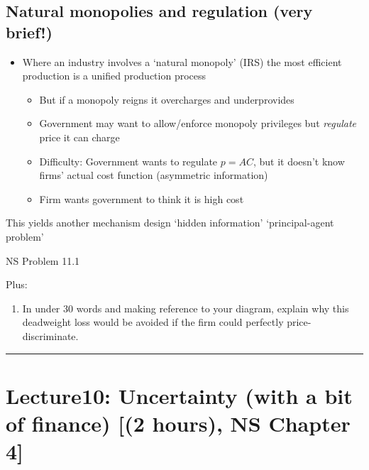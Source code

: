 \documentclass[]{article}
\providecommand{\tightlist}{%
  \setlength{\itemsep}{0pt}\setlength{\parskip}{0pt}}
\begin{document}
\hypertarget{natural-monopolies-and-regulation-very-brief}{%
\subsection{Natural monopolies and regulation (very brief!)}\label{natural-monopolies-and-regulation-very-brief}}

\begin{itemize}
\tightlist
\item
  Where an industry involves a `natural monopoly' (IRS) the most efficient production is a unified production process

  \begin{itemize}
  \tightlist
  \item
    But if a monopoly reigns it overcharges and underprovides
  \item
    Government may want to allow/enforce monopoly privileges but \emph{regulate} price it can charge
  \item
    Difficulty: Government wants to regulate \(p=AC\), but it doesn't know firms' actual cost function (asymmetric information)
  \item
    Firm wants government to think it is high cost
  \end{itemize}
\end{itemize}

This yields another mechanism design `hidden information' `principal-agent problem'

NS Problem 11.1

Plus:

\begin{enumerate}
\def\labelenumi{\alph{enumi}.}
\setcounter{enumi}{3}
\tightlist
\item
  In under 30 words and making reference to your diagram, explain why this deadweight loss would be avoided if the firm could perfectly price-discriminate.
\end{enumerate}

\begin{center}\rule{0.5\linewidth}{\linethickness}\end{center}

\hypertarget{lecture10-uncertainty-with-a-bit-of-finance-2-hours-ns-chapter-4}{%
\section{Lecture10: Uncertainty (with a bit of finance) {[}(2 hours), NS Chapter 4{]}}\label{lecture10-uncertainty-with-a-bit-of-finance-2-hours-ns-chapter-4}}
\end{document}
